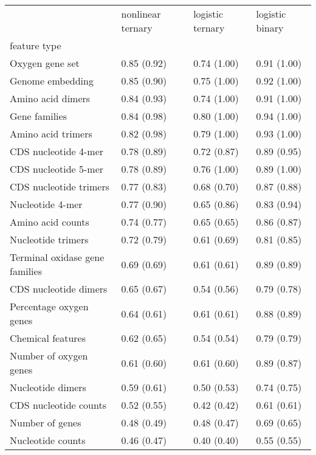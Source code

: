 \begin{tabular}{llll}
\toprule
 & nonlinear ternary & logistic ternary & logistic binary \\
feature type &  &  &  \\
\midrule
Oxygen gene set & 0.85 (0.92) & 0.74 (1.00) & 0.91 (1.00) \\
Genome embedding & 0.85 (0.90) & 0.75 (1.00) & 0.92 (1.00) \\
Amino acid dimers & 0.84 (0.93) & 0.74 (1.00) & 0.91 (1.00) \\
Gene families & 0.84 (0.98) & 0.80 (1.00) & 0.94 (1.00) \\
Amino acid trimers & 0.82 (0.98) & 0.79 (1.00) & 0.93 (1.00) \\
CDS nucleotide 4-mer & 0.78 (0.89) & 0.72 (0.87) & 0.89 (0.95) \\
CDS nucleotide 5-mer & 0.78 (0.89) & 0.76 (1.00) & 0.89 (1.00) \\
CDS nucleotide trimers & 0.77 (0.83) & 0.68 (0.70) & 0.87 (0.88) \\
Nucleotide 4-mer & 0.77 (0.90) & 0.65 (0.86) & 0.83 (0.94) \\
Amino acid counts & 0.74 (0.77) & 0.65 (0.65) & 0.86 (0.87) \\
Nucleotide trimers & 0.72 (0.79) & 0.61 (0.69) & 0.81 (0.85) \\
Terminal oxidase gene families & 0.69 (0.69) & 0.61 (0.61) & 0.89 (0.89) \\
CDS nucleotide dimers & 0.65 (0.67) & 0.54 (0.56) & 0.79 (0.78) \\
Percentage oxygen genes & 0.64 (0.61) & 0.61 (0.61) & 0.88 (0.89) \\
Chemical features & 0.62 (0.65) & 0.54 (0.54) & 0.79 (0.79) \\
Number of oxygen genes & 0.61 (0.60) & 0.61 (0.60) & 0.89 (0.87) \\
Nucleotide dimers & 0.59 (0.61) & 0.50 (0.53) & 0.74 (0.75) \\
CDS nucleotide counts & 0.52 (0.55) & 0.42 (0.42) & 0.61 (0.61) \\
Number of genes & 0.48 (0.49) & 0.48 (0.47) & 0.69 (0.65) \\
Nucleotide counts & 0.46 (0.47) & 0.40 (0.40) & 0.55 (0.55) \\
\bottomrule
\end{tabular}
